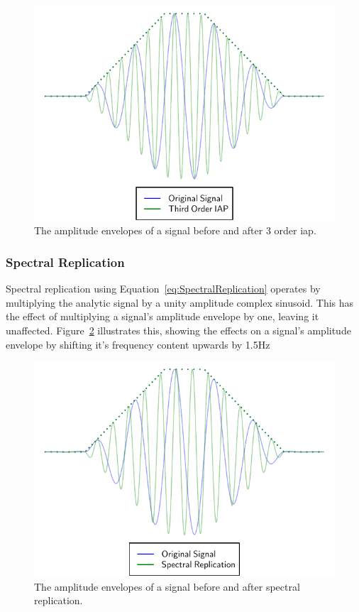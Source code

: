 			\begin{figure}[h!]
				\centering
				\includegraphics{chapter5/Images/IAPTemporalEffects.pdf}
				\caption{The amplitude envelopes of a signal before and after 3 order
					 \acrshort{iap}.}
				\label{fig:IAPTemporalEffects}
			\end{figure}
			
		\subsubsection*{Spectral Replication}
			Spectral replication using Equation~\ref{eq:SpectralReplication} operates by multiplying the
			analytic signal by a unity amplitude complex sinusoid. This has the effect of multiplying a
			signal's amplitude envelope by one, leaving it unaffected.
			Figure~\ref{fig:SpectralReplicationTemporalEffects} illustrates this, showing the effects on a
			signal's amplitude envelope by shifting it's frequency content upwards by 1.5Hz

			\begin{figure}[h!]
				\centering
				\includegraphics{chapter5/Images/SpectralReplicationTemporalEffects.pdf}
				\caption{The amplitude envelopes of a signal before and after spectral replication.}
				\label{fig:SpectralReplicationTemporalEffects}
			\end{figure}

